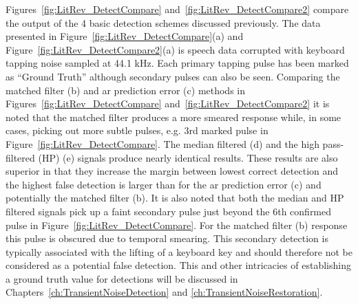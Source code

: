 Figures~\ref{fig:LitRev_DetectCompare} and~\ref{fig:LitRev_DetectCompare2} compare the output of the 4 basic detection schemes discussed previously. The data presented in Figure~\ref{fig:LitRev_DetectCompare}(a) and Figure~\ref{fig:LitRev_DetectCompare2}(a) is speech data corrupted with keyboard tapping noise sampled at 44.1 kHz. Each primary tapping pulse has been marked as ``Ground Truth'' although secondary pulses can also be seen. Comparing the matched filter (b) and \gls{ar} prediction error (c) methods in Figures~\ref{fig:LitRev_DetectCompare} and~\ref{fig:LitRev_DetectCompare2} it is noted that the matched filter produces a more smeared response while, in some cases, picking out more subtle pulses\cite{Godsill1998book}, e.g. 3rd marked pulse in Figure~\ref{fig:LitRev_DetectCompare}. The median filtered (d) and the high pass-filtered (HP) (e) signals produce nearly identical results. These results are also superior in that they increase the margin between lowest correct detection and the highest false detection is larger than for the \gls{ar} prediction error (c) and potentially the matched filter (b). It is also noted that both the median and HP filtered signals pick up a faint secondary pulse just beyond the 6th confirmed pulse in Figure~\ref{fig:LitRev_DetectCompare}. For the matched filter (b) response this pulse is obscured due to temporal smearing. This secondary detection is typically associated with the lifting of a keyboard key and should therefore not be considered as a potential false detection. This and other intricacies of establishing a ground truth value for detections will be discussed in Chapters~\ref{ch:TransientNoiseDetection} and \ref{ch:TransientNoiseRestoration}.


